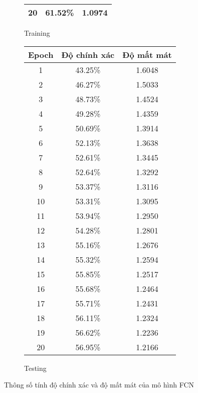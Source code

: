 \documentclass[../main.tex]{subfiles}
\begin{document}
\begin{figure}[h!]
\begin{subfigure}[b]{0.45\textwidth}
\begin{tabular}{|c|c|c|}
            \hline
            20 & 61.52\% & 1.0974 \\
            \hline
        \end{tabular}
        \caption{Training}
    \end{subfigure}
    \hfill
    \begin{subfigure}[b]{0.45\textwidth}
        \centering
        \begin{tabular}{|c|c|c|}
            \hline
            \textbf{Epoch} & \textbf{Độ chính xác} & \textbf{Độ mất mát} \\
            \hline
            1 & 43.25\% & 1.6048 \\
            \hline
            2 & 46.27\% & 1.5033 \\
            \hline
            3 & 48.73\% & 1.4524 \\
            \hline
            4 & 49.28\% & 1.4359 \\
            \hline
            5 & 50.69\% & 1.3914 \\
            \hline
            6 & 52.13\% & 1.3638 \\
            \hline
            7 & 52.61\% & 1.3445 \\
            \hline
            8 & 52.64\% & 1.3292 \\
            \hline
            9 & 53.37\% & 1.3116 \\
            \hline
            10 & 53.31\% & 1.3095 \\
            \hline
            11 & 53.94\% & 1.2950 \\
            \hline
            12 & 54.28\% & 1.2801 \\
            \hline
            13 & 55.16\% & 1.2676 \\
            \hline
            14 & 55.32\% & 1.2594 \\
            \hline
            15 & 55.85\% & 1.2517 \\
            \hline
            16 & 55.68\% & 1.2464 \\
            \hline
            17 & 55.71\% & 1.2431 \\
            \hline
            18 & 56.11\% & 1.2324 \\
            \hline
            19 & 56.62\% & 1.2236 \\
            \hline
            20 & 56.95\% & 1.2166 \\
            \hline
        \end{tabular}
        \caption{Testing}
    \end{subfigure}
    \caption{Thông số tính độ chính xác và độ mất mát của mô hình FCN}
\end{figure}
\end{document}
